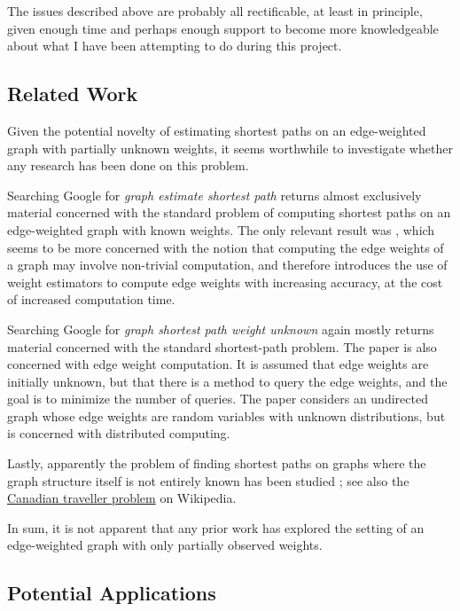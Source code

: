 The issues described above are probably all rectificable, at least in principle, given enough time and perhaps enough support to become more knowledgeable about what I have been attempting to do during this project.

\subsection{Related Work}

Given the potential novelty of estimating shortest paths on an edge-weighted graph with partially unknown weights, it seems worthwhile to investigate whether any research has been done on this problem.

Searching Google for \textit{graph estimate shortest path} returns almost exclusively material concerned with the standard problem of computing shortest paths on an edge-weighted graph with known weights. The only relevant result was \cite{weiss2022generalization}, which seems to be more concerned with the notion that computing the edge weights of a graph may involve non-trivial computation, and therefore introduces the use of weight estimators to compute edge weights with increasing accuracy, at the cost of increased computation time.

Searching Google for \textit{graph shortest path weight unknown} again mostly returns material concerned with the standard shortest-path problem. The paper \cite{szepesvari2004shortest} is also concerned with edge weight computation. It is assumed that edge weights are initially unknown, but that there is a method to query the edge weights, and the goal is to minimize the number of queries. The paper \cite{tehrani2013distributed} considers an undirected graph whose edge weights are random variables with unknown distributions, but is concerned with distributed computing.

Lastly, apparently the problem of finding shortest paths on graphs where the graph structure itself is not entirely known has been studied \cite{papadimitriou1991shortest}; see also the \href{https://en.wikipedia.org/wiki/Canadian_traveller_problem#:~:text=In%20computer%20science%20and%20graph,a%20certain%20%22realization%20restriction.%22}{Canadian traveller problem} on Wikipedia.

In sum, it is not apparent that any prior work has explored the setting of an edge-weighted graph with only partially observed weights.

\subsection{Potential Applications}\label{sec:pot_app}


